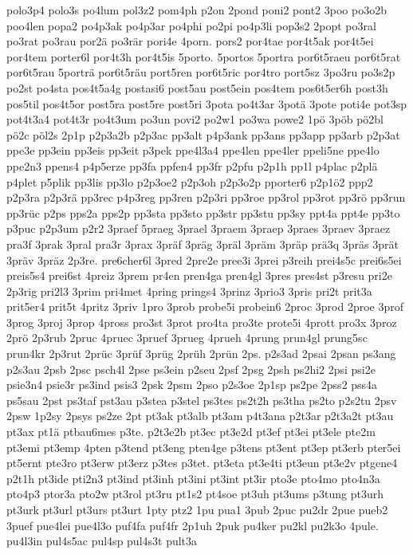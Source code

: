 {polo3p4
polo3s
po4lum
pol3z2
pom4ph
p2on
2pond
poni2
pont2
3poo
po3o2b
poo4len
popa2
po4p3ak
po4p3ar
po4phi
po2pi
po4p3li
pop3s2
2popt
po3ral
po3rat
po3rau
por2ä
po3rär
pori4e
4porn.
pors2
por4tae
por4t5ak
por4t5ei
por4tem
porter6l
por4t3h
por4t5is
5porto.
5portos
5portra
por6t5raeu
por6t5rat
por6t5rau
5porträ
por6t5räu
port5ren
por6t5ric
por4tro
port5sz
3po3ru
po3s2p
po2st
po4sta
pos4t5a4g
postasi6
post5au
post5ein
pos4tem
pos6t5er6h
post3h
pos5til
pos4t5or
post5ra
post5re
post5ri
3pota
po4t3ar
3potä
3pote
poti4e
pot3sp
pot4t3a4
pot4t3r
po4t3um
po3un
povi2
po2w1
po3wa
powe2
1pö
3pöb
pö2bl
pö2c
pöl2s
2p1p
p2p3a2b
p2p3ac
pp3alt
p4p3ank
pp3ans
pp3app
pp3arb
p2p3at
ppe3e
pp3ein
pp3eis
pp3eit
p3pek
ppe4l3a4
ppe4len
ppe4ler
ppeli5ne
ppe4lo
ppe2n3
ppens4
p4p5erze
pp3fa
ppfen4
pp3fr
p2pfu
p2p1h
pp1l
p4plac
p2plä
p4plet
p5plik
pp3lis
pp3lo
p2p3oe2
p2p3oh
p2p3o2p
pporter6
p2p1ö2
ppp2
p2p3ra
p2p3rä
pp3rec
p4p3reg
pp3ren
p2p3ri
pp3roe
pp3rol
pp3rot
pp3rö
pp3run
pp3rüc
p2ps
pps2a
pps2p
pp3sta
pp3sto
pp3str
pp3stu
pp3sy
ppt4a
ppt4e
pp3to
p3puc
p2p3um
p2r2
3praef
5praeg
3prael
3praem
3praep
3praes
3praev
3praez
pra3f
3prak
3pral
pra3r
3prax
3präf
3präg
3präl
3präm
3präp
prä3q
3präs
3prät
3präv
3präz
2p3re.
pre6cher6l
3pred
2pre2e
pree3i
3prei
p3reih
prei4s5c
prei6s5ei
preis5s4
prei6st
4preiz
3prem
pr4en
pren4ga
pren4gl
3pres
pres4st
p3resu
pri2e
2p3rig
pri2l3
3prim
pri4met
4pring
prings4
3prinz
3prio3
3pris
pri2t
prit3a
prit5er4
prit5t
4pritz
3priv
1pro
3prob
probe5i
probein6
2proc
3prod
2proe
3prof
3prog
3proj
3prop
4pross
pro3st
3prot
pro4ta
pro3te
prote5i
4prott
pro3x
3proz
2prö
2p3rub
2pruc
4pruec
3pruef
3prueg
4prueh
4prung
prun4gl
prung5sc
prun4kr
2p3rut
2prüc
3prüf
3prüg
2prüh
2prün
2ps.
p2s3ad
2psai
2psan
ps3ang
p2s3au
2psb
2psc
psch4l
2pse
ps3ein
p2seu
2psf
2psg
2psh
ps2hi2
2psi
psi2e
psie3n4
psie3r
ps3ind
psis3
2psk
2psm
2pso
p2s3oe
2p1sp
ps2pe
2pss2
pss4a
ps5sau
2pst
ps3taf
pst3au
p3stea
p3stel
ps3tes
ps2t2h
ps3tha
ps2to
p2s2tu
2psv
2psw
1p2sy
2psys
ps2ze
2pt
pt3ak
pt3alb
pt3am
p4t3ana
p2t3ar
p2t3a2t
pt3au
pt3ax
pt1ä
ptbau6mes
p3te.
p2t3e2b
pt3ec
pt3e2d
pt3ef
pt3ei
pt3ele
pte2m
pt3emi
pt3emp
4pten
p3tend
pt3eng
pten4ge
p3tens
pt3ent
pt3ep
pt3erb
pter5ei
pt5ernt
pte3ro
pt3erw
pt3erz
p3tes
p3tet.
pt3eta
pt3e4ti
pt3eun
pt3e2v
ptgene4
p2t1h
pt3ide
pti2n3
pt3ind
pt3inh
pt3ini
pt3int
pt3ir
pto3e
pto4mo
pto4n3a
pto4p3
ptor3a
pto2w
pt3rol
pt3ru
pt1s2
pt4soe
pt3uh
pt3ums
p3tung
pt3urh
pt3urk
pt3url
pt3urs
pt3urt
1pty
ptz2
1pu
pua1
3pub
2puc
pu2dr
2pue
pueb2
3puef
pue4lei
pue4l3o
puf4fa
puf4fr
2p1uh
2puk
pu4ker
pu2kl
pu2k3o
4pule.
pu4l3in
pul4s5ac
pul4sp
pul4s3t
pult3a
}
